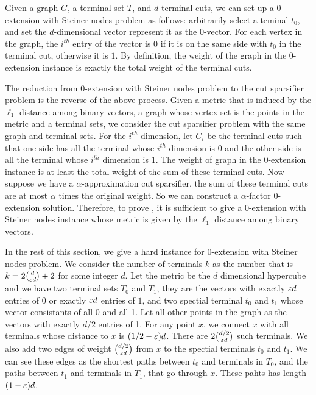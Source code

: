 Given a graph $G$, a terminal set $T$, and $d$ terminal cuts, we can set up a 0-extension with Steiner nodes problem as follows: arbitrarily select a teminal $t_0$, and set the $d$-dimensional vector represent it as the $0$-vector. For each vertex in the graph, the $i^{th}$ entry of the vector is $0$ if it is on the same side with $t_0$ in the terminal cut, otherwise it is $1$. By definition, the weight of the graph in the 0-extension instance is exactly the total weight of the terminal cuts.

The reduction from 0-extension with Steiner nodes problem to the cut sparsifier problem is the reverse of the above process. Given a metric that is induced by the $\ell_1$ distance among binary vectors, a graph whose vertex set is the points in the metric and a terminal sets, we consider the cut sparsifier problem with the same graph and terminal sets. For the $i^{th}$ dimension, let $C_i$ be the terminal cuts such that one side has all the terminal whose $i^{th}$ dimension is $0$ and the other side is all the terminal whose $i^{th}$ dimension is $1$. The weight of graph in the 0-extension instance is at least the total weight of the sum of these terminal cuts. Now suppose we have a $\alpha$-approximation cut sparsifier, the sum of these terminal cuts are at most $\alpha$ times the original weight. So we can construct a $\alpha$-factor 0-extension solution. Therefore, to prove , it is sufficient to give a 0-extension with Steiner nodes instance whose metric is given by the $\ell_1$ distance among binary vectors.

In the rest of this section, we give a hard instance for 0-extension with Steiner nodes problem. We consider the number of terminals $k$ as the number that is $k=2\binom{d}{{\varepsilon} d}+2$ for some integer $d$. Let the metric be the $d$ dimensional hypercube and we have two terminal sets $T_0$ and $T_1$, they are the vectors with exactly ${\varepsilon} d$ entries of 0 or exactly ${\varepsilon} d$ entries of $1$, and two spectial terminal $t_0$ and $t_1$ whose vector consistants of all 0 and all 1. Let all other points in the graph as the vectors with exactly $d/2$ entries of 1. For any point $x$, we connect $x$ with all terminals whose distance to $x$ is $(1/2-{\varepsilon})d$. There are $2\binom{d/2}{{\varepsilon} d}$ such terminals. We also add two edges of weight $\binom{d/2}{{\varepsilon} d}$ from $x$ to the spectial terminals $t_0$ and $t_1$. We can see these edges as the shortest paths between $t_0$ and terminals in $T_0$, and the paths between $t_1$ and terminals in $T_1$, that go through $x$. These pahts has length $(1-{\varepsilon})d$.

